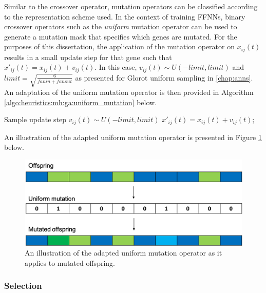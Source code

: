 Similar to the crossover operator, mutation operators can be classified according to the representation scheme used. In the context of training 
\acp{FFNN}, binary crossover operators such as the \textit{uniform} mutation operator can be used to generate a mutation mask that specifies which genes are mutated. For the purposes of this dissertation, the application of the mutation operator on $x_{ij}(t)$ results in a small update step for that gene such that $x'_{ij}(t) = x_{ij}(t) + v_{ij}(t)$. In this case, $v_{ij}(t) \sim U(-limit, limit)$ and $limit = \sqrt{\frac{6}{fanin + fanout}}$ as presented for Glorot uniform sampling in \ref{chap:anns}. An adaptation of the uniform mutation operator is then provided in Algorithm \ref{algo:heuristics:mh:ga:uniform_mutation} below.

\begin{algorithm}[H]
    \caption{The pseudo code for the uniform mutation operator as used by \acp{GA}.}
    \label{algo:heuristics:mh:ga:uniform_mutation}
    \begin{algorithmic}
                \State Sample update step $v_{ij}(t) \sim U(-limit, limit)$
                \State $x'_{ij}(t) = x_{ij}(t) + v_{ij}(t)$;
            \EndIf
        \EndFor
        \State
    \end{algorithmic}
\end{algorithm}

An illustration of the adapted uniform mutation operator is presented in Figure \ref{fig:heuristics:mh:ga:uniform_mutation} below.

\begin{figure}[htbp]
    \includegraphics[width=\textwidth]{images/uniform_mutation.png}
    \caption{An illustration of the adapted uniform mutation operator as it applies to mutated offspring.}
    \label{fig:heuristics:mh:ga:uniform_mutation}
\end{figure}

\subsubsection{Selection}
\label{sec:heuristics:mh:ga:selection}

